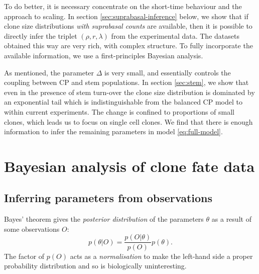 \documentclass[10pt,UKenglish]{article}
\begin{document}
To do better, it is necessary concentrate on the short-time behaviour and the approach to scaling. In section \ref{sec:suprabasal-inference} below, we show that if clone size distributions \emph{with suprabasal counts} are available, then it is possible to directly infer the triplet $(\rho, r, \lambda)$ from the experimental data. The datasets obtained this way are very rich, with complex structure. To fully incorporate the available information, we use a first-principles Bayesian analysis.

As mentioned, the parameter $\Delta$ is very small, and essentially controls the coupling between CP and stem populations. In section \ref{sec:stem}, we show that even in the presence of stem turn-over the clone size distribution is dominated by an exponential tail which is indistinguishable from the balanced CP model to within current experiments. The change is confined to proportions of small clones, which leads us to focus on single cell clones. We find that there is enough information to infer the remaining parameters in model \ref{eq:full-model}.

\section{\label{sec:suprabasal-inference}Bayesian analysis of clone fate data}

\subsection{Inferring parameters from observations}

Bayes' theorem gives the \emph{posterior distribution} of the parameters $\theta$ as a result of some observations $O$: $$p(\theta|O) = \frac{p(O|\theta)}{p(O)} p(\theta).$$ The factor of $p(O)$ acts as a \emph{normalisation} to make the left-hand side a proper probability distribution and so is biologically uninteresting. 
\end{document}
